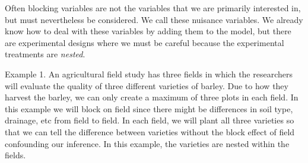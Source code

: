\documentclass[]{book}
\theoremstyle{definition}
\theoremstyle{definition}
\theoremstyle{remark}
\begin{document}
Often blocking variables are not the variables that we are primarily
interested in, but must nevertheless be considered. We call these
nuisance variables. We already know how to deal with these variables by
adding them to the model, but there are experimental designs where we
must be careful because the experimental treatments are \emph{nested}.

Example 1. An agricultural field study has three fields in which the
researchers will evaluate the quality of three different varieties of
barley. Due to how they harvest the barley, we can only create a maximum
of three plots in each field. In this example we will block on field
since there might be differences in soil type, drainage, etc from field
to field. In each field, we will plant all three varieties so that we
can tell the difference between varieties without the block effect of
field confounding our inference. In this example, the varieties are
nested within the fields.
\end{document}
